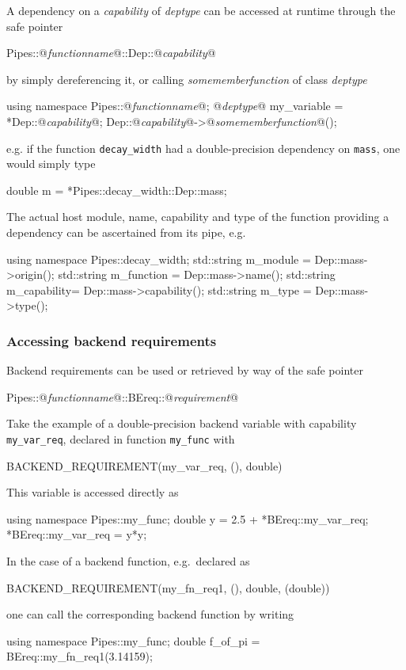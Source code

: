\documentclass[pdftex,twocolumn,epjc3_preprint,runningheads]{svjour3}
\renewcommand{\_}{\discretionary{\underscore}{}{\underscore}}
\newcommand{\metavarf}[1]{\textit{\color{darkgreen}\footnotesize\textrm{#1}}}
\newcommand{\metavar}{\metavarf}
\begin{document}
A dependency on a \metavar{capability} of \metavar{dep\_type} can be accessed at runtime through the safe pointer
\begin{lstcpp}
Pipes::@\metavar{function\_name}@::Dep::@\metavar{capability}@
\end{lstcpp}
by simply dereferencing it, or calling \metavar{some\_member\_function} of class \metavar{dep\_type}
\begin{lstcpp}
using namespace Pipes::@\metavar{function\_name}@;
@\metavar{dep\_type}@ my_variable = *Dep::@\metavar{capability}@;
Dep::@\metavar{capability}@->@\metavar{some\_member\_function}@();
\end{lstcpp}
e.g. if the function \lstinline{decay_width} had a double-precision dependency on \lstinline{mass}, one would simply type
\begin{lstcpp}
double m = *Pipes::decay_width::Dep::mass;
\end{lstcpp}
The actual host module, name, capability and type of the function providing a dependency can be ascertained from its pipe, e.g.
\begin{lstcpp}
using namespace Pipes::decay_width;
std::string m_module    = Dep::mass->origin();
std::string m_function  = Dep::mass->name();
std::string m_capability= Dep::mass->capability();
std::string m_type      = Dep::mass->type();
\end{lstcpp}

\subsubsection{Accessing backend requirements}

Backend requirements can be used or retrieved by way of the safe pointer
\begin{lstcpp}
Pipes::@\metavar{function\_name}@::BEreq::@\metavar{requirement}@
\end{lstcpp}

Take the example of a double-precision backend variable with capability \lstinline{my_var_req}, declared in function \lstinline{my_func} with
\begin{lstcpp}
BACKEND_REQUIREMENT(my_var_req, (), double)
\end{lstcpp}
This variable is accessed directly as
\begin{lstcpp}
using namespace Pipes::my_func;
double y = 2.5 + *BEreq::my_var_req;
*BEreq::my_var_req = y*y;
\end{lstcpp}

In the case of a backend function, e.g.\ declared as
\begin{lstcpp}
BACKEND_REQUIREMENT(my_fn_req1, (), double,
 (double))
\end{lstcpp}
one can call the corresponding backend function by writing
\begin{lstcpp}
using namespace Pipes::my_func;
double f_of_pi = BEreq::my_fn_req1(3.14159);
\end{lstcpp}
\end{document}
